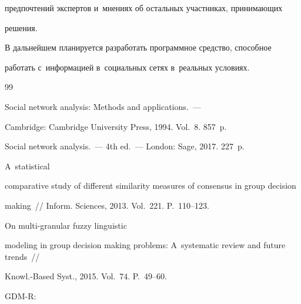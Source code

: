 предпочтений экспертов и~мнениях об остальных участниках, принимающих 


решения. 


  


  В дальнейшем планируется разработать программное средство, способное 


работать с~информацией в~социальных сетях в~реальных условиях.








{\small\frenchspacing


{%




\begin{thebibliography}{99}







 Social network analysis: Methods and applications.~--- 


Cambridge: Cambridge University Press, 1994. Vol.~8. 857~p.




 Social network analysis.~--- 4th ed.~--- London: Sage, 2017. 227~p.










 A~statistical 


comparative study of different similarity measures of consensus in group decision 


making~/\!\!/ Inform. Sciences, 2013. Vol.~221. P.~110--123.




 On multi-granular fuzzy linguistic 


modeling in group decision making problems: A~systematic review and future trends~/\!\!/ 


Knowl.-Based Syst., 2015. Vol.~74. P.~49--60.




 GDM-R: 



\end{thebibliography}}}

